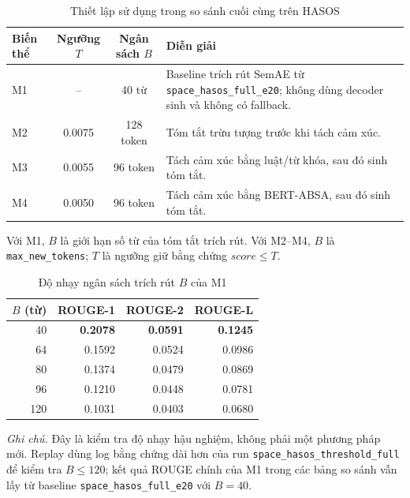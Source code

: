 \documentclass[12pt,a4paper]{report}
\begin{document}
\begin{table}[tbp]
\centering
\caption{Thiết lập sử dụng trong so sánh cuối cùng trên HASOS}
\label{tab:optimal-settings}
\begin{threeparttable}
\begin{tabularx}{\textwidth}{l c c Y}
\toprule
\textbf{Biến thể} & \textbf{Ngưỡng $T$} & \textbf{Ngân sách $B$} & \textbf{Diễn giải} \\
\midrule
M1 & -- & 40 từ & Baseline trích rút SemAE từ \texttt{space\_hasos\_full\_e20}; không dùng decoder sinh và không có fallback. \\
M2 & 0.0075 & 128 token & Tóm tắt trừu tượng trước khi tách cảm xúc. \\
M3 & 0.0055 & 96 token & Tách cảm xúc bằng luật/từ khóa, sau đó sinh tóm tắt. \\
M4 & 0.0050 & 96 token & Tách cảm xúc bằng BERT-ABSA, sau đó sinh tóm tắt. \\
\bottomrule
\end{tabularx}
\begin{tablenotes}
\footnotesize
\item Với M1, $B$ là giới hạn số từ của tóm tắt trích rút. Với M2--M4, $B$ là \texttt{max\_new\_tokens}; $T$ là ngưỡng giữ bằng chứng $score \leq T$.
\end{tablenotes}
\end{threeparttable}
\end{table}

\begin{table}[tbp]
\centering
\caption{Độ nhạy ngân sách trích rút $B$ của M1}
\label{tab:m1-token-sweep}
\small
\begin{tabular}{r r r r}
\toprule
\textbf{$B$ (từ)} & \textbf{ROUGE-1} & \textbf{ROUGE-2} & \textbf{ROUGE-L} \\
\midrule
40  & \textbf{\num{0.2078}} & \textbf{\num{0.0591}} & \textbf{\num{0.1245}} \\
64  & \num{0.1592} & \num{0.0524} & \num{0.0986} \\
80  & \num{0.1374} & \num{0.0479} & \num{0.0869} \\
96  & \num{0.1210} & \num{0.0448} & \num{0.0781} \\
120 & \num{0.1031} & \num{0.0403} & \num{0.0680} \\
\bottomrule
\end{tabular}

\vspace{0.35em}
\begin{minipage}{0.82\textwidth}
\footnotesize\RaggedRight
\textit{Ghi chú.} Đây là kiểm tra độ nhạy hậu nghiệm, không phải một phương pháp mới. Replay dùng log bằng chứng dài hơn của run \texttt{space\_hasos\_threshold\_full} để kiểm tra $B \leq 120$; kết quả ROUGE chính của M1 trong các bảng so sánh vẫn lấy từ baseline \texttt{space\_hasos\_full\_e20} với $B=40$.
\end{minipage}
\end{table}
\end{document}
